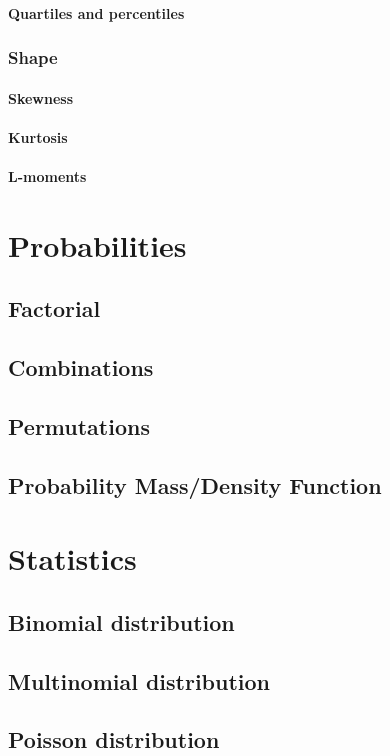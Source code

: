 \documentclass{report}
\begin{document}
	\subsubsection{Quartiles and percentiles}
	\subsection{Shape}
	\subsubsection{Skewness}
	\subsubsection{Kurtosis}
	\subsubsection{L-moments}

\chapter{Probabilities}
	\section{Factorial}
	\section{Combinations}
	\section{Permutations}
	\section{Probability Mass/Density Function}

\chapter{Statistics}
	\section{Binomial distribution}
	\section{Multinomial distribution}
	\section{Poisson distribution}
\end{document}
